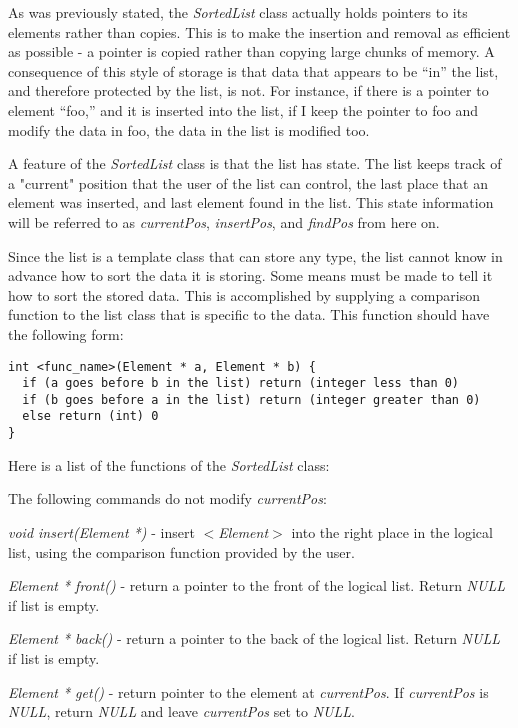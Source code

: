 \documentclass[11pt]{report}
\begin{document}
As was previously stated, the {\it SortedList} class actually holds
pointers to its elements rather than copies.  This is to make the
insertion and removal as efficient as possible - a pointer is copied
rather than copying large chunks of memory.  A consequence of this style
of storage is that data that appears to be ``in'' the list, and therefore
protected by the list, is not.  For instance, if there is a pointer to
element ``foo,'' and it is inserted into the list, if I keep the pointer
to foo and modify the data in foo, the data in the list is modified too.

A feature of the {\it SortedList} class is that the list has state.  The
list keeps track of a "current" position that the user of the list can
control, the last place that an element was inserted, and last element
found in the list.  This state information will be referred to as {\it
currentPos}, {\it insertPos}, and {\it findPos} from here on.

Since the list is a template class that can store any type, the list
cannot know in advance how to sort the data it is storing.  Some means
must be made to tell it how to sort the stored data.  This is accomplished
by supplying a comparison function to the list class that is specific to
the data.  This function should have the following form:

\begin{verbatim}
int <func_name>(Element * a, Element * b) {
  if (a goes before b in the list) return (integer less than 0)
  if (b goes before a in the list) return (integer greater than 0)
  else return (int) 0
}
\end{verbatim}

Here is a list of the functions of the {\it SortedList} class:

The following commands do not modify {\it currentPos}:

{\it void insert(Element *)} - insert $<${\it Element}$>$ into the right place
in the logical list, using the comparison function provided by the user.

{\it Element * front()} - return a pointer to the front of the logical
list.  Return {\it NULL} if list is empty.

{\it Element * back()} - return a pointer to the back of the logical
list.  Return {\it NULL} if list is empty.

{\it Element * get()} - return pointer to the element at
{\it currentPos}.  If {\it currentPos} is {\it NULL}, return
{\it NULL} and leave {\it currentPos} set to {\it NULL}.
\end{document}
